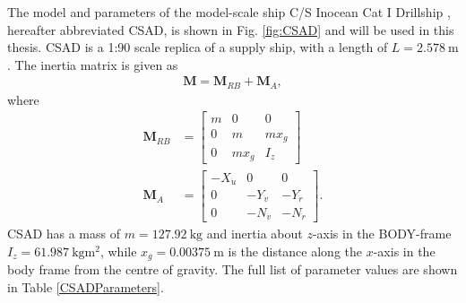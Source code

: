 The model and parameters of the model-scale ship C/S Inocean Cat I Drillship \cite{bjorno}, hereafter abbreviated CSAD, is shown in Fig. \ref{fig:CSAD} and will be used in this thesis. CSAD is a 1:90 scale replica of a supply ship, with a length of $L = 2.578 ~\si{\meter}$.
The inertia matrix is given as
\begin{align}
\boldsymbol{M} = \boldsymbol{M}_{RB}+\boldsymbol{M}_{A},
\end{align}
where
\begin{align}
\boldsymbol{M}_{RB} &= \begin{bmatrix}
m & 0 & 0\\
0 & m & m x_g\\
0 & m x_g & I_z
\end{bmatrix}\\
 \boldsymbol{M}_A &= \begin{bmatrix}
-X_{\dot{u}} & 0 & 0\\
0 & -Y_{\dot{v}} & -Y_{\dot{r}}\\
0 & -N_{\dot{v}} & -N_{\dot{r}}
\end{bmatrix}.
\end{align}
CSAD has a mass of $m = 127.92 ~\si{\kilo\gram}$ and inertia about $z$-axis in the BODY-frame $I_z =  61.987 ~\si{\kilo\gram\meter\squared}$, while $x_g =  0.00375 ~\si{\meter}$ is the distance along the $x$-axis in the body frame from the centre of gravity. The full list of parameter values are shown in Table \ref{CSADParameters}.

